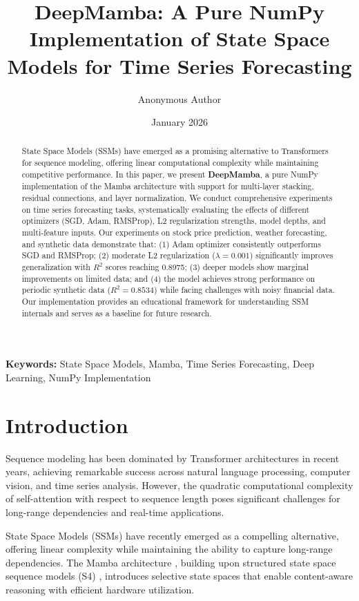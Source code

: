 \documentclass[11pt,a4paper]{article}
\title{\textbf{DeepMamba: A Pure NumPy Implementation of State Space Models for Time Series Forecasting}}
\author[1]{Anonymous Author}
\affil[1]{Anonymous Institution}
\date{January 2026}
\begin{document}
\maketitle

\begin{abstract}
State Space Models (SSMs) have emerged as a promising alternative to Transformers for sequence modeling, offering linear computational complexity while maintaining competitive performance. In this paper, we present \textbf{DeepMamba}, a pure NumPy implementation of the Mamba architecture with support for multi-layer stacking, residual connections, and layer normalization. We conduct comprehensive experiments on time series forecasting tasks, systematically evaluating the effects of different optimizers (SGD, Adam, RMSProp), L2 regularization strengths, model depths, and multi-feature inputs. Our experiments on stock price prediction, weather forecasting, and synthetic data demonstrate that: (1) Adam optimizer consistently outperforms SGD and RMSProp; (2) moderate L2 regularization ($\lambda=0.001$) significantly improves generalization with $R^2$ scores reaching 0.8975; (3) deeper models show marginal improvements on limited data; and (4) the model achieves strong performance on periodic synthetic data ($R^2=0.8534$) while facing challenges with noisy financial data. Our implementation provides an educational framework for understanding SSM internals and serves as a baseline for future research.
\end{abstract}

\textbf{Keywords:} State Space Models, Mamba, Time Series Forecasting, Deep Learning, NumPy Implementation

\section{Introduction}

Sequence modeling has been dominated by Transformer architectures \cite{vaswani2017attention} in recent years, achieving remarkable success across natural language processing, computer vision, and time series analysis. However, the quadratic computational complexity of self-attention with respect to sequence length poses significant challenges for long-range dependencies and real-time applications.

State Space Models (SSMs) have recently emerged as a compelling alternative, offering linear complexity while maintaining the ability to capture long-range dependencies. The Mamba architecture \cite{gu2023mamba}, building upon structured state space sequence models (S4) \cite{gu2021efficiently}, introduces selective state spaces that enable content-aware reasoning with efficient hardware utilization.
\end{document}
